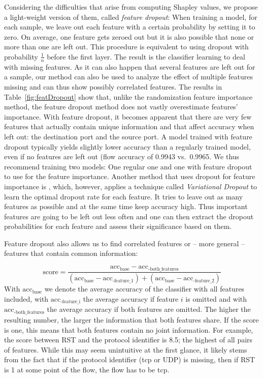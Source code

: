 \documentclass[conference]{IEEEtran}
\begin{document}
Considering the difficulties that arise from computing Shapley values, we propose a light-weight version of them, called \textit{feature dropout}: When training a model, for each sample, we leave out each feature with a certain probability by setting it to zero. On average, one feature gets zeroed out but it is also possible that none or more than one are left out. This procedure is equivalent to using dropout \cite{srivastava_dropout:_2014} with probability $\frac{1}{n}$ before the first layer. The result is the classifier learning to deal with missing features. As it can also happen that several features are left out for a sample, our method can also be used to analyze the effect of multiple features missing and can thus show possibly correlated features. The results in Table~\ref{fig:featDropout} show that, unlike the randomization feature importance method, the feature dropout method does not vastly overestimate features' importance. With feature dropout, it becomes apparent that there are very few features that actually contain unique information and that affect accuracy when left out: the destination port and the source port. A model trained with feature dropout typically yields slightly lower accuracy than a regularly trained model, even if no features are left out (flow accuracy of 0.9943 vs.~0.9965. We thus recommend training two models: One regular one and one with feature dropout to use for the feature importance. Another method that uses dropout for feature importance is \cite{chang_dropout_2017}, which, however, applies a technique called \textit{Variational Dropout} to learn the optimal dropout rate for each feature. It tries to leave out as many features as possible and at the same time keep accuracy high. Thus important features are going to be left out less often and one can then extract the dropout probabilities for each feature and assess their significance based on them. 

Feature dropout also allows us to find correlated features or -- more general -- features that contain common information: 

\begin{equation}
\text{score} = \frac{\text{acc}_\text{base}-\text{acc}_\text{-both\_features}}{\left(\text{acc}_\text{base}-\text{acc}_\text{-feature\_1}\right) + \left(\text{acc}_\text{base}-\text{acc}_\text{-feature\_2}\right)}
\end{equation}
With $\text{acc}_\text{base}$ we denote the average accuracy of the classifier with all features included, with $\text{acc}_\text{-feature\_i}$ the average accuracy if feature $i$ is omitted and with $\text{acc}_\text{-both\_features}$ the average accuracy if both features are omitted. The higher the resulting number, the larger the information that both features share. If the score is one, this means that both features contain no joint information. For example, the score between RST and the protocol identifier is 8.5; the highest of all pairs of features. While this may seem unintuitive at the first glance, it likely stems from the fact that if the protocol identifier (\gls{tcp} or UDP) is missing, then if RST is 1 at some point of the flow, the flow has to be \gls{tcp}.
\end{document}
